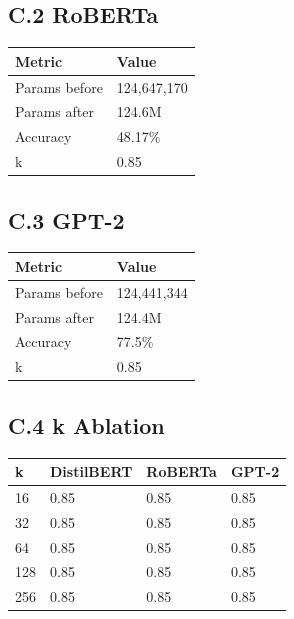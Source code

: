 \subsection{C.2 RoBERTa}

\begin{table}[H]
\centering
\small
\begin{tabular}{ll}
\toprule
\textbf{Metric} & \textbf{Value} \\
\midrule
Params before & 124,647,170 \\
Params after & 124.6M \\
Accuracy & 48.17\% \\
k & 0.85 \\
\bottomrule
\end{tabular}
\end{table}

\subsection{C.3 GPT-2}

\begin{table}[H]
\centering
\small
\begin{tabular}{ll}
\toprule
\textbf{Metric} & \textbf{Value} \\
\midrule
Params before & 124,441,344 \\
Params after & 124.4M \\
Accuracy & 77.5\% \\
k & 0.85 \\
\bottomrule
\end{tabular}
\end{table}

\subsection{C.4 k Ablation}

\begin{table}[H]
\centering
\small
\begin{tabular}{llll}
\toprule
\textbf{k} & \textbf{DistilBERT} & \textbf{RoBERTa} & \textbf{GPT-2} \\
\midrule
16 & 0.85 & 0.85 & 0.85 \\
32 & 0.85 & 0.85 & 0.85 \\
64 & 0.85 & 0.85 & 0.85 \\
128 & 0.85 & 0.85 & 0.85 \\
256 & 0.85 & 0.85 & 0.85 \\
\bottomrule
\end{tabular}
\end{table}

